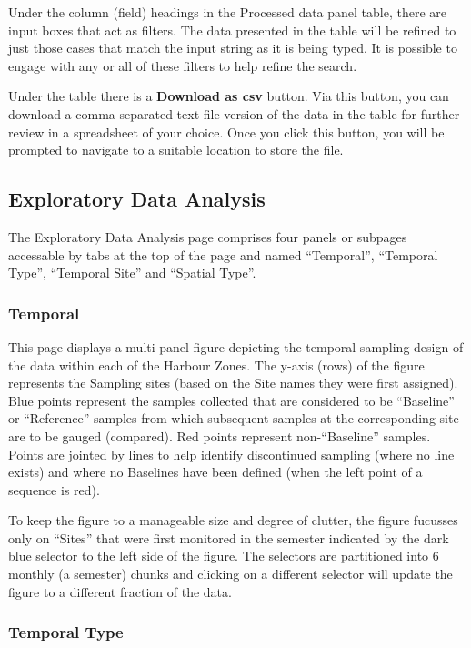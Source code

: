 \documentclass[
  8pt,
  a4paper]{article}
\begin{document}
Under the column (field) headings in the Processed data panel table,
there are input boxes that act as filters. The data presented in the
table will be refined to just those cases that match the input string as
it is being typed. It is possible to engage with any or all of these
filters to help refine the search.

Under the table there is a \textbf{Download as csv} button. Via this
button, you can download a comma separated text file version of the data
in the table for further review in a spreadsheet of your choice. Once
you click this button, you will be prompted to navigate to a suitable
location to store the file.

\subsection{Exploratory Data Analysis}\label{exploratory-data-analysis}

The Exploratory Data Analysis page comprises four panels or subpages
accessable by tabs at the top of the page and named ``Temporal'',
``Temporal Type'', ``Temporal Site'' and ``Spatial Type''.

\subsubsection{Temporal}\label{temporal}

This page displays a multi-panel figure depicting the temporal sampling
design of the data within each of the Harbour Zones. The y-axis (rows)
of the figure represents the Sampling sites (based on the Site names
they were first assigned). Blue points represent the samples collected
that are considered to be ``Baseline'' or ``Reference'' samples from
which subsequent samples at the corresponding site are to be gauged
(compared). Red points represent non-``Baseline'' samples. Points are
jointed by lines to help identify discontinued sampling (where no line
exists) and where no Baselines have been defined (when the left point of
a sequence is red).

To keep the figure to a manageable size and degree of clutter, the
figure fucusses only on ``Sites'' that were first monitored in the
semester indicated by the dark blue selector to the left side of the
figure. The selectors are partitioned into 6 monthly (a semester) chunks
and clicking on a different selector will update the figure to a
different fraction of the data.

\subsubsection{Temporal Type}\label{temporal-type}
\end{document}
